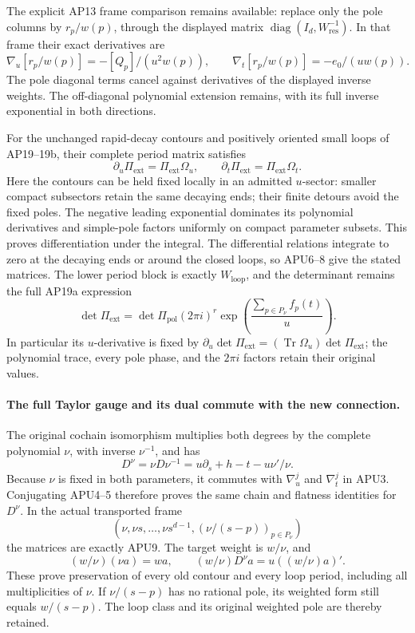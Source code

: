 The explicit AP13 frame comparison remains available:
replace only the pole columns by \(r_p/w(p)\), through the
displayed matrix
\(\operatorname{diag}(I_d,W_{\mathrm{res}}^{-1})\).
In that frame their exact derivatives are
\[
 \nabla_u[r_p/w(p)]=-[Q_p]/(u^2w(p)),\qquad
 \nabla_t[r_p/w(p)]=-e_0/(uw(p)).
 \tag{APU13}
\]
The pole diagonal terms cancel against derivatives of the displayed
inverse weights.  The off-diagonal polynomial extension remains,
with its full inverse exponential in both directions.

For the unchanged rapid-decay contours and positively oriented
small loops of AP19--19b, their complete period matrix satisfies
\[
 \partial_u\Pi_{\mathrm{ext}}=\Pi_{\mathrm{ext}}\Omega_u,\qquad
 \partial_t\Pi_{\mathrm{ext}}=\Pi_{\mathrm{ext}}\Omega_t .
 \tag{APU14}
\]
Here the contours can be held fixed locally in an admitted
\(u\)-sector: smaller compact subsectors retain the same decaying
ends; their finite detours avoid the fixed poles.  The negative
leading exponential dominates its polynomial derivatives and
simple-pole factors uniformly on compact parameter subsets.
This proves differentiation under the integral.  The differential
relations integrate to zero at the decaying ends or around the
closed loops, so APU6--8 give the stated matrices.
The lower period block is exactly \(W_{\mathrm{loop}}\), and
the determinant remains the full AP19a expression
\[
 \det\Pi_{\mathrm{ext}}
   =\det\Pi_{\mathrm{pol}}(2\pi i)^r
                 \exp\!\left(\frac{\sum_{p\in P_\nu}f_p(t)}u\right).
 \tag{APU15}
\]
In particular its \(u\)-derivative is fixed by
\(\partial_u\det\Pi_{\mathrm{ext}}
=(\operatorname{Tr}\Omega_u)\det\Pi_{\mathrm{ext}}\);
the polynomial trace, every pole phase, and the \(2\pi i\) factors
retain their original values.

\paragraph{The full Taylor gauge and its dual commute with the new connection.}
The original cochain isomorphism multiplies both degrees by the
complete polynomial \(\nu\), with inverse \(\nu^{-1}\), and has
\[
 D^\nu=\nu D\nu^{-1}
       =u\partial_s+h-t-u\nu'/\nu .
\]
Because \(\nu\) is fixed in both parameters, it commutes with
\(\nabla_u^j\) and \(\nabla_t^j\) in APU3.  Conjugating APU4--5
therefore proves the same chain and flatness identities for
\(D^\nu\).  In the actual transported frame
\[
 (\nu,\nu s,\ldots,\nu s^{d-1},(\nu/(s-p))_{p\in P_\nu})
\]
the matrices are exactly APU9.  The target weight is \(w/\nu\),
and
\[
 (w/\nu)(\nu a)=wa,\qquad
 (w/\nu)D^\nu a=u((w/\nu)a)' .
 \tag{APU16}
\]
These prove preservation of every old contour and every loop
period, including all multiplicities of \(\nu\).  If \(\nu/(s-p)\)
has no rational pole, its weighted form still equals \(w/(s-p)\).
The loop class and its original weighted pole are thereby retained.

